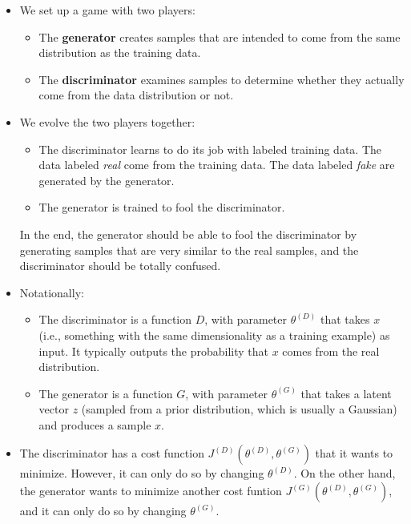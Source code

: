 \documentclass[10pt]{article}
\begin{document}
  \begin{itemize}
    \item We set up a game with two players:

    \begin{itemize}
      \item The \textbf{generator} creates samples that are intended to come from the same distribution as the training data.

      \item The \textbf{discriminator} examines samples to determine whether they actually come from the data distribution or not.
    \end{itemize}

    \item We evolve the two players together:

    \begin{itemize}
      \item The discriminator learns to do its job with labeled training data. The data labeled \emph{real} come from the training data. The data labeled \emph{fake} are generated by the generator.

      \item The generator is trained to fool the discriminator.
    \end{itemize}

    In the end, the generator should be able to fool the discriminator by generating samples that are very similar to the real samples, and the discriminator should be totally confused.

    \item Notationally:
    \begin{itemize}
      \item The discriminator is a function $D$, with parameter $\theta^{(D)}$ that takes $x$ (i.e., something with the same dimensionality as a training example) as input. It typically outputs the probability that $x$ comes from the real distribution.

      \item The generator is a function $G$, with parameter $\theta^{(G)}$ that takes a latent vector $z$ (sampled from a prior distribution, which is usually a Gaussian) and produces a sample $x$.      
    \end{itemize}

    \item The discriminator has a cost function $J^{(D)}(\theta^{(D)}, \theta^{(G)})$ that it wants to minimize. However, it can only do so by changing $\theta^{(D)}$. On the other hand, the generator wants to minimize another cost funtion $J^{(G)}(\theta^{(D)}, \theta^{(G)})$, and it can only do so by changing $\theta^{(G)}$.


\end{itemize}
\end{document}

